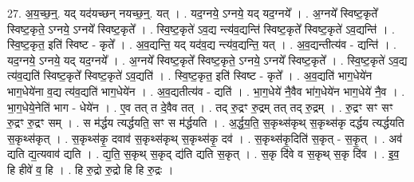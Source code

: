 \documentclass[17pt]{extarticle}
\begin{document}
27. अ॒य॒च्छ॒न्॒. यद् यद॑यच्छन् नयच्छ॒न्॒. यत् । . यद॒ग्नये॒ ऽग्नये॒ यद् यद॒ग्नये᳚ । . अ॒ग्नये᳚ स्विष्ट॒कृते᳚ स्विष्ट॒कृते॒ ऽग्नये॒ ऽग्नये᳚ स्विष्ट॒कृते᳚ । . स्वि॒ष्ट॒कृते॑ ऽव॒द्य न्त्य॑व॒द्यन्ति॑ स्विष्ट॒कृते᳚ स्विष्ट॒कृते॑ ऽव॒द्यन्ति॑ । . स्वि॒ष्ट॒कृत॒ इति॑ स्विष्ट - कृते᳚ । . अ॒व॒द्यन्ति॒ यद् यद॑व॒द्य न्त्य॑व॒द्यन्ति॒ यत् । . अ॒व॒द्यन्तीत्य॑व - द्यन्ति॑ । . यद॒ग्नये॒ ऽग्नये॒ यद् यद॒ग्नये᳚ । . अ॒ग्नये᳚ स्विष्ट॒कृते᳚ स्विष्ट॒कृते॒ ऽग्नये॒ ऽग्नये᳚ स्विष्ट॒कृते᳚ । . स्वि॒ष्ट॒कृते॑ ऽव॒द्य त्य॑व॒द्यति॑ स्विष्ट॒कृते᳚ स्विष्ट॒कृते॑ ऽव॒द्यति॑ । . स्वि॒ष्ट॒कृत॒ इति॑ स्विष्ट - कृते᳚ । . अ॒व॒द्यति॑ भाग॒धेये॑न भाग॒धेये॑ना व॒द्य त्य॑व॒द्यति॑ भाग॒धेये॑न । . अ॒व॒द्यतीत्य॑व - द्यति॑ । . भा॒ग॒धेये॑ नै॒वैव भा॑ग॒धेये॑न भाग॒धेये॑ नै॒व । . भा॒ग॒धेये॒नेति॑ भाग - धेये॑न । . ए॒व तत् त दे॒वैव तत् । . तद् रु॒द्रꣳ रु॒द्रम् तत् तद् रु॒द्रम् । . रु॒द्रꣳ सꣳ सꣳ रु॒द्रꣳ रु॒द्रꣳ सम् । . स म॑र्द्धय त्यर्द्धयति॒ सꣳ स म॑र्द्धयति । . अ॒र्द्ध॒य॒ति॒ स॒कृथ्स॑कृथ् स॒कृथ्स॑कृ दर्द्धय त्यर्द्धयति स॒कृथ्स॑कृत् । . स॒कृथ्स॑कृ॒ दवाव॑ स॒कृथ्स॑कृथ् स॒कृथ्स॑कृ॒ दव॑ । . स॒कृथ्स॑कृ॒दिति॑ स॒कृत् - स॒कृ॒त् । . अव॑ द्यति द्य॒त्यवाव॑ द्यति । . द्य॒ति॒ स॒कृथ् स॒कृद् द्य॑ति द्यति स॒कृत् । . स॒कृ दि॑वे व स॒कृथ् स॒कृ दि॑व । . इ॒व॒ हि हीवे॑ व॒ हि । . हि रु॒द्रो रु॒द्रो हि हि रु॒द्रः । \newline
\end{document}
